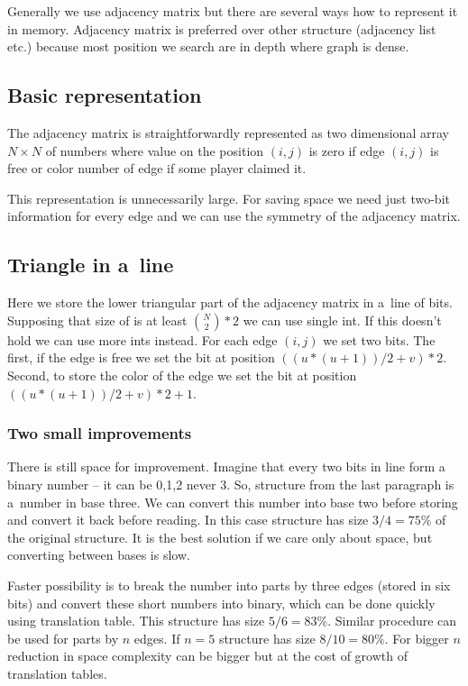 Generally we use adjacency matrix but there are several ways how to represent
it in memory. Adjacency matrix is preferred over other structure (adjacency list etc.) because
most position we search are in depth where graph is dense.

\subsection{Basic representation }
The adjacency matrix is straightforwardly represented as two 
dimensional array $N \times N$ of numbers where value on the position
$(i,j)$ is zero if edge $(i,j)$ is free or color number of edge if some player claimed it.

This representation is unnecessarily large. For saving space we need just
two-bit information for every edge and we can use the symmetry of the adjacency
matrix. 

\subsection{Triangle in a~line }

Here we store the lower triangular part of the adjacency matrix in a~line of
bits. Supposing that size of  is at least ${N
\choose 2} * 2$ we can use single int. If this doesn't hold we can use more
ints instead. For each edge $(i,j)$ we set two bits. The first, if the edge is free
we set the bit at position $((u*(u+1))/2+v)*2$. Second, to store the color of
the edge we set the bit at position $((u*(u+1))/2+v)*2+1$.

\subsubsection{ Two small improvements }

There is still space for improvement. Imagine that every two bits in line form
a binary number \--- it can be 0,1,2 never 3. So, structure from the last
paragraph is a~number in base three. We can convert this number into base two
before storing and convert it back before reading. In this case structure has
size $ 3/4=75\% $ of the original structure. It is the best solution if we care
only about space, but converting between bases is slow.

Faster possibility is to break the number into parts by three edges (stored
in six bits) and convert these short numbers into binary, which can be done
quickly using translation table. This structure has size $5/6 = 83\% $. Similar
procedure can be used for parts by $n$ edges. If $n=5$ structure has size 
$8/10=80\%$. For bigger $n$ reduction in space complexity can be bigger
but at the cost of growth of translation tables.


